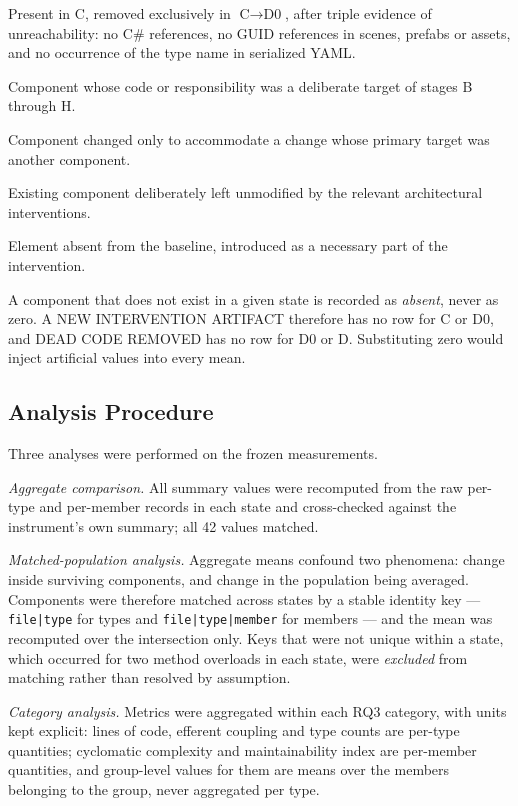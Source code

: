 \documentclass{sbc2019}%
\begin{document}
\begin{description}\itemsep2pt
\item[DEAD CODE REMOVED] Present in C, removed exclusively in $\text{C}\rightarrow\text{D0}$,
after triple evidence of unreachability: no C\# references, no GUID references in
scenes, prefabs or assets, and no occurrence of the type name in serialized YAML\@.
\item[DIRECTLY REFACTORED] Component whose code or responsibility was a deliberate
target of stages B through H.
\item[INDIRECTLY AFFECTED] Component changed only to accommodate a change whose
primary target was another component.
\item[PRESERVED] Existing component deliberately left unmodified by the relevant
architectural interventions.
\item[NEW INTERVENTION ARTIFACT] Element absent from the baseline, introduced as a
necessary part of the intervention.
\end{description}

A component that does not exist in a given state is recorded as \emph{absent},
never as zero. A NEW INTERVENTION ARTIFACT therefore has no row for C or D0, and
DEAD CODE REMOVED has no row for D0 or D. Substituting zero would inject
artificial values into every mean.

\subsection{Analysis Procedure}

Three analyses were performed on the frozen measurements.

\emph{Aggregate comparison.} All summary values were recomputed from the raw
per-type and per-member records in each state and cross-checked against the
instrument's own summary; all 42 values matched.

\emph{Matched-population analysis.} Aggregate means confound two phenomena:
change inside surviving components, and change in the population being averaged.
Components were therefore matched across states by a stable identity key ---
\texttt{file|type} for types and \texttt{file|type|member} for members --- and
the mean was recomputed over the intersection only. Keys that were not unique
within a state, which occurred for two method overloads in each state, were
\emph{excluded} from matching rather than resolved by assumption.

\emph{Category analysis.} Metrics were aggregated within each RQ3 category, with
units kept explicit: lines of code, efferent coupling and type counts are
per-type quantities; cyclomatic complexity and maintainability index are
per-member quantities, and group-level values for them are means over the
members belonging to the group, never aggregated per type.
\end{document}
